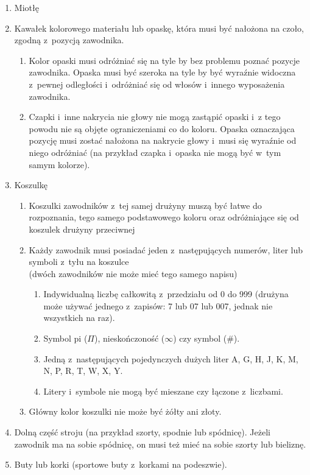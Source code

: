 \documentclass[12pt,a4paper]{article}
\begin{document}
\begin{enumerate}
	\item
	      Miotłę
	\item
	      Kawałek kolorowego materiału lub opaskę, która musi być nałożona na
	      czoło, zgodną z~pozycją zawodnika.

	      \begin{enumerate}
		      \item
		            Kolor opaski musi odróżniać się na tyle by bez problemu poznać
		            pozycje zawodnika.
		            Opaska musi być szeroka na tyle by być wyraźnie widoczna z~pewnej odległości i~odróżniać się od włosów i~innego wyposażenia zawodnika.
		      \item
		            Czapki i~inne nakrycia nie głowy nie mogą zastąpić opaski i~z tego
		            powodu nie są objęte ograniczeniami co do koloru. Opaska oznaczająca
		            pozycję musi zostać nałożona na nakrycie głowy i~musi się wyraźnie
		            od niego odróżniać (na przykład czapka i~opaska nie mogą być w~tym
		            samym kolorze).
	      \end{enumerate}
	\item
	      Koszulkę

	      \begin{enumerate}
		      \item
		            Koszulki zawodników z~tej samej drużyny muszą być łatwe do
		            rozpoznania, tego samego podstawowego koloru oraz odróżniające się
		            od koszulek drużyny przeciwnej
		      \item
		            Każdy zawodnik musi posiadać jeden z~następujących
				numerów, liter lub symboli z~tyłu na koszulce \\
				(dwóch zawodników nie może mieć tego samego napisu)

		            \begin{enumerate}
			            \item
			                  Indywidualną liczbę całkowitą z~przedziału od 0 do 999 (drużyna
			                  może używać jednego z~zapisów: 7 lub 07 lub 007, jednak nie
			                  wszystkich na raz).
			            \item
			                  Symbol pi ($\Pi$), nieskończoność ($\infty$) czy symbol (\#).
			            \item
			                  Jedną z~następujących pojedynczych dużych liter A, G, H, J, K, M,
			                  N, P, R, T, W, X, Y.
			            \item
			                  Litery i~symbole nie mogą być mieszane czy łączone z~liczbami.
		            \end{enumerate}
		      \item
		            Główny kolor koszulki nie może być żółty ani złoty.
	      \end{enumerate}
	\item
	      Dolną część stroju (na przykład szorty, spodnie lub spódnicę). Jeżeli
	      zawodnik ma na sobie spódnicę, on musi też mieć na sobie szorty lub
	      bieliznę.
	\item
	      Buty lub korki (sportowe buty z~korkami na podeszwie).


\end{enumerate}
\end{document}
